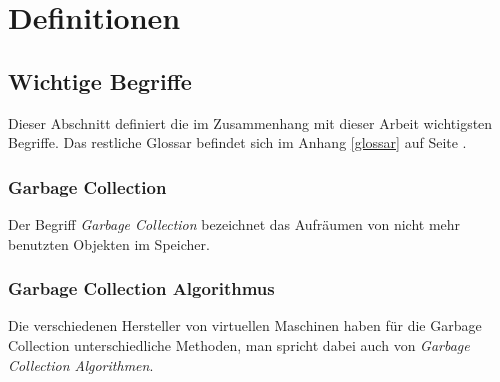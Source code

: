 \chapter{Definitionen}
\section*{Wichtige Begriffe}
Dieser Abschnitt definiert die im Zusammenhang mit dieser Arbeit wichtigsten Begriffe. Das restliche Glossar befindet sich im Anhang \ref{glossar} auf Seite \pageref{glossar}.
\subsection*{Garbage Collection}
Der Begriff \textit{Garbage Collection} bezeichnet das Aufräumen von nicht mehr benutzten Objekten im Speicher.
\subsection*{Garbage Collection Algorithmus }
Die verschiedenen Hersteller von virtuellen Maschinen haben für die Garbage Collection unterschiedliche Methoden, man spricht dabei auch von \textit{Garbage Collection Algorithmen}. 